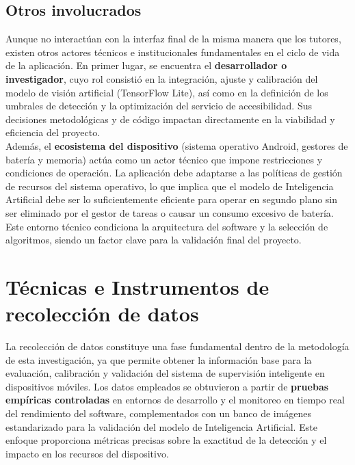 \subsection{Otros involucrados}

Aunque no interactúan con la interfaz final de la misma manera que los tutores, existen otros actores técnicos e institucionales fundamentales en el ciclo de vida de la aplicación. En primer lugar, se encuentra el \textbf{desarrollador o investigador}, cuyo rol consistió en la integración, ajuste y calibración del modelo de visión artificial (TensorFlow Lite), así como en la definición de los umbrales de detección y la optimización del servicio de accesibilidad. Sus decisiones metodológicas y de código impactan directamente en la viabilidad y eficiencia del proyecto.\\

Además, el \textbf{ecosistema del dispositivo} (sistema operativo Android, gestores de batería y memoria) actúa como un actor técnico que impone restricciones y condiciones de operación. La aplicación debe adaptarse a las políticas de gestión de recursos del sistema operativo, lo que implica que el modelo de Inteligencia Artificial debe ser lo suficientemente eficiente para operar en segundo plano sin ser eliminado por el gestor de tareas o causar un consumo excesivo de batería. Este entorno técnico condiciona la arquitectura del software y la selección de algoritmos, siendo un factor clave para la validación final del proyecto.\\

\section{Técnicas e Instrumentos de recolección de datos}

La recolección de datos constituye una fase fundamental dentro de la metodología de esta investigación, ya que permite obtener la información base para la evaluación,
calibración y validación del sistema de supervisión inteligente en dispositivos móviles. Los datos empleados se obtuvieron a partir de \textbf{pruebas empíricas controladas} 
en entornos de desarrollo y el monitoreo en tiempo real del rendimiento del software, complementados con un banco de imágenes estandarizado para la validación del modelo de Inteligencia Artificial. 
Este enfoque proporciona métricas precisas sobre la exactitud de la detección y el impacto en los recursos del dispositivo.\\

